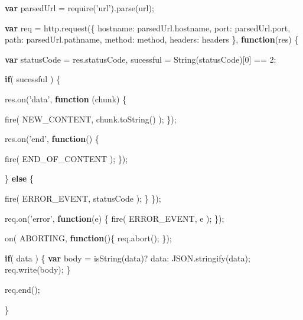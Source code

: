 \documentclass[]{article}
\newenvironment{Shaded}{}{}
\newcommand{\KeywordTok}[1]{\textcolor[rgb]{0.00,0.44,0.13}{\textbf{{#1}}}}
\newcommand{\DataTypeTok}[1]{\textcolor[rgb]{0.56,0.13,0.00}{{#1}}}
\newcommand{\DecValTok}[1]{\textcolor[rgb]{0.25,0.63,0.44}{{#1}}}
\newcommand{\StringTok}[1]{\textcolor[rgb]{0.25,0.44,0.63}{{#1}}}
\newcommand{\OtherTok}[1]{\textcolor[rgb]{0.00,0.44,0.13}{{#1}}}
\newcommand{\FunctionTok}[1]{\textcolor[rgb]{0.02,0.16,0.49}{{#1}}}
\newcommand{\NormalTok}[1]{{#1}}
\begin{document}
\begin{Shaded}
\begin{Highlighting}[]
   \KeywordTok{var} \NormalTok{parsedUrl = }\FunctionTok{require}\NormalTok{(}\StringTok{'url'}\NormalTok{).}\FunctionTok{parse}\NormalTok{(url);}

   \KeywordTok{var} \NormalTok{req = }\OtherTok{http}\NormalTok{.}\FunctionTok{request}\NormalTok{(\{}
      \DataTypeTok{hostname}\NormalTok{: }\OtherTok{parsedUrl}\NormalTok{.}\FunctionTok{hostname}\NormalTok{,}
      \DataTypeTok{port}\NormalTok{: }\OtherTok{parsedUrl}\NormalTok{.}\FunctionTok{port}\NormalTok{,}
      \DataTypeTok{path}\NormalTok{: }\OtherTok{parsedUrl}\NormalTok{.}\FunctionTok{pathname}\NormalTok{,}
      \DataTypeTok{method}\NormalTok{: method,}
      \DataTypeTok{headers}\NormalTok{: headers}
   \NormalTok{\}, }\KeywordTok{function}\NormalTok{(res) \{}
      
      \KeywordTok{var} \NormalTok{statusCode = }\OtherTok{res}\NormalTok{.}\FunctionTok{statusCode}\NormalTok{,}
          \NormalTok{sucessful = }\FunctionTok{String}\NormalTok{(statusCode)[}\DecValTok{0}\NormalTok{] == }\DecValTok{2}\NormalTok{;}
                             
      \KeywordTok{if}\NormalTok{( sucessful ) \{          }
            
         \OtherTok{res}\NormalTok{.}\FunctionTok{on}\NormalTok{(}\StringTok{'data'}\NormalTok{, }\KeywordTok{function} \NormalTok{(chunk) \{}
                           
            \FunctionTok{fire}\NormalTok{( NEW_CONTENT, }\OtherTok{chunk}\NormalTok{.}\FunctionTok{toString}\NormalTok{() );}
         \NormalTok{\});}
         
         \OtherTok{res}\NormalTok{.}\FunctionTok{on}\NormalTok{(}\StringTok{'end'}\NormalTok{, }\KeywordTok{function}\NormalTok{() \{}
                  
            \FunctionTok{fire}\NormalTok{( END_OF_CONTENT );}
         \NormalTok{\});}
         
      \NormalTok{\} }\KeywordTok{else} \NormalTok{\{}
      
         \FunctionTok{fire}\NormalTok{( ERROR_EVENT, statusCode );}
      \NormalTok{\}}
   \NormalTok{\});}
   
   \OtherTok{req}\NormalTok{.}\FunctionTok{on}\NormalTok{(}\StringTok{'error'}\NormalTok{, }\KeywordTok{function}\NormalTok{(e) \{}
      \FunctionTok{fire}\NormalTok{( ERROR_EVENT, e );}
   \NormalTok{\});}
   
   \FunctionTok{on}\NormalTok{( ABORTING, }\KeywordTok{function}\NormalTok{()\{              }
      \OtherTok{req}\NormalTok{.}\FunctionTok{abort}\NormalTok{();}
   \NormalTok{\});}
      
   \KeywordTok{if}\NormalTok{( data ) \{}
      \KeywordTok{var} \NormalTok{body = }\FunctionTok{isString}\NormalTok{(data)? data: }\OtherTok{JSON}\NormalTok{.}\FunctionTok{stringify}\NormalTok{(data);}
      \OtherTok{req}\NormalTok{.}\FunctionTok{write}\NormalTok{(body);}
   \NormalTok{\}}
   
   \OtherTok{req}\NormalTok{.}\FunctionTok{end}\NormalTok{();}

\NormalTok{\}}
\end{Highlighting}
\end{Shaded}
\end{document}
